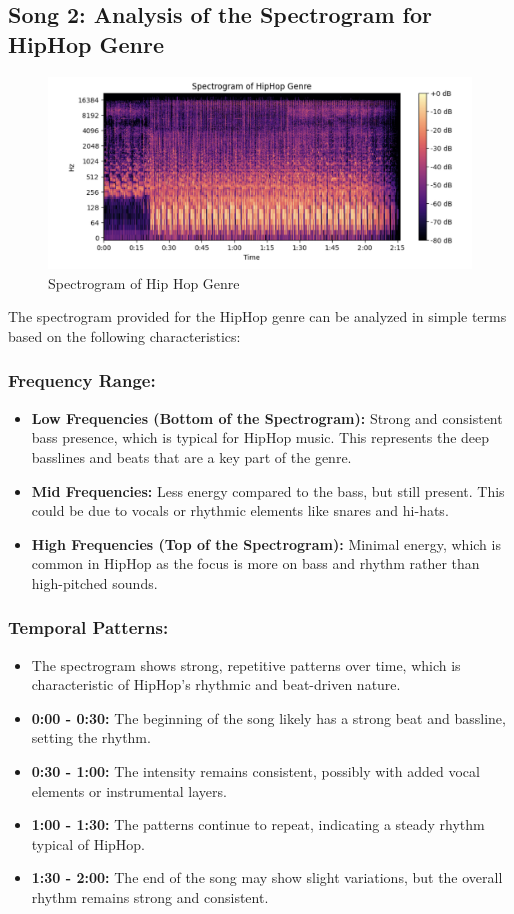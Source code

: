 \documentclass[a4paper,12pt]{article}
\begin{document}
\subsection{Song 2: Analysis of the Spectrogram for HipHop Genre}
\begin{figure}[H]
    \centering
    \includegraphics[width=1\linewidth]{2.png}
    \caption{Spectrogram of Hip Hop Genre}
\end{figure}
The spectrogram provided for the HipHop genre can be analyzed in simple terms based on the following characteristics:

\subsubsection{Frequency Range:}
\begin{itemize}
    \item \textbf{Low Frequencies (Bottom of the Spectrogram):} Strong and consistent bass presence, which is typical for HipHop music. This represents the deep basslines and beats that are a key part of the genre.
    \item \textbf{Mid Frequencies:} Less energy compared to the bass, but still present. This could be due to vocals or rhythmic elements like snares and hi-hats.
    \item \textbf{High Frequencies (Top of the Spectrogram):} Minimal energy, which is common in HipHop as the focus is more on bass and rhythm rather than high-pitched sounds.
\end{itemize}
\subsubsection{Temporal Patterns:}
\begin{itemize}
    \item The spectrogram shows strong, repetitive patterns over time, which is characteristic of HipHop's rhythmic and beat-driven nature.
    \item \textbf{0:00 - 0:30:} The beginning of the song likely has a strong beat and bassline, setting the rhythm.
    \item \textbf{0:30 - 1:00:} The intensity remains consistent, possibly with added vocal elements or instrumental layers.
    \item \textbf{1:00 - 1:30:} The patterns continue to repeat, indicating a steady rhythm typical of HipHop.
    \item \textbf{1:30 - 2:00:} The end of the song may show slight variations, but the overall rhythm remains strong and consistent.
\end{itemize}
\end{document}
